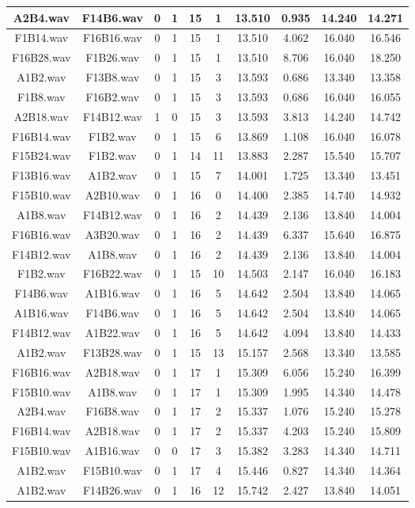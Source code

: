 \documentclass[11pt,a4paper]{book}
\begin{document}
\begin{longtable}[c]{|c|c|c|c|c|c|c|c|c|c|}
A2B4.wav&F14B6.wav&0&1&15&1&13.510&0.935&14.240&14.271\\ \hline
F1B14.wav&F16B16.wav&0&1&15&1&13.510&4.062&16.040&16.546\\ \hline
F16B28.wav&F1B26.wav&0&1&15&1&13.510&8.706&16.040&18.250\\ \hline
A1B2.wav&F13B8.wav&0&1&15&3&13.593&0.686&13.340&13.358\\ \hline
F1B8.wav&F16B2.wav&0&1&15&3&13.593&0.686&16.040&16.055\\ \hline
A2B18.wav&F14B12.wav&1&0&15&3&13.593&3.813&14.240&14.742\\ \hline
F16B14.wav&F1B2.wav&0&1&15&6&13.869&1.108&16.040&16.078\\ \hline
F15B24.wav&F1B2.wav&0&1&14&11&13.883&2.287&15.540&15.707\\ \hline
F13B16.wav&A1B2.wav&0&1&15&7&14.001&1.725&13.340&13.451\\ \hline
F15B10.wav&A2B10.wav&0&1&16&0&14.400&2.385&14.740&14.932\\ \hline
A1B8.wav&F14B12.wav&0&1&16&2&14.439&2.136&13.840&14.004\\ \hline
F16B16.wav&A3B20.wav&0&1&16&2&14.439&6.337&15.640&16.875\\ \hline
F14B12.wav&A1B8.wav&0&1&16&2&14.439&2.136&13.840&14.004\\ \hline
F1B2.wav&F16B22.wav&0&1&15&10&14.503&2.147&16.040&16.183\\ \hline
F14B6.wav&A1B16.wav&0&1&16&5&14.642&2.504&13.840&14.065\\ \hline
A1B16.wav&F14B6.wav&0&1&16&5&14.642&2.504&13.840&14.065\\ \hline
F14B12.wav&A1B22.wav&0&1&16&5&14.642&4.094&13.840&14.433\\ \hline
A1B2.wav&F13B28.wav&0&1&15&13&15.157&2.568&13.340&13.585\\ \hline
F16B16.wav&A2B18.wav&0&1&17&1&15.309&6.056&15.240&16.399\\ \hline
F15B10.wav&A1B8.wav&0&1&17&1&15.309&1.995&14.340&14.478\\ \hline
A2B4.wav&F16B8.wav&0&1&17&2&15.337&1.076&15.240&15.278\\ \hline
F16B14.wav&A2B18.wav&0&1&17&2&15.337&4.203&15.240&15.809\\ \hline
F15B10.wav&A1B16.wav&0&0&17&3&15.382&3.283&14.340&14.711\\ \hline
A1B2.wav&F15B10.wav&0&1&17&4&15.446&0.827&14.340&14.364\\ \hline
A1B2.wav&F14B26.wav&0&1&16&12&15.742&2.427&13.840&14.051\\ \hline

\end{longtable}
\end{document}
